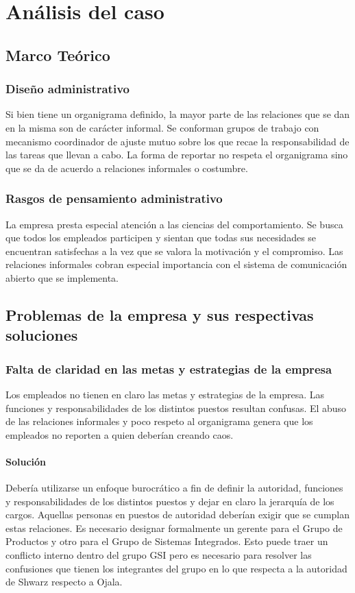\documentclass[12pt,a4paper,spanish]{article}
\begin{document}
\newpage
\section{An\'{a}lisis del caso}

	\subsection{Marco Te\'orico}

		\subsubsection{Dise\~{n}o administrativo}
			Si bien tiene un organigrama definido, la mayor parte de las relaciones que se dan en la misma son de car\'{a}cter informal. Se conforman grupos de trabajo con mecanismo coordinador de ajuste mutuo sobre los que recae la responsabilidad de las tareas que llevan a cabo. La forma de reportar no respeta el organigrama sino que se da de acuerdo a relaciones informales o costumbre.

		\subsubsection{Rasgos de pensamiento administrativo}
			La empresa presta especial atenci\'{o}n a las ciencias del comportamiento. Se busca que todos los empleados participen y sientan que todas sus necesidades se encuentran satisfechas a la vez que se valora la motivaci\'{o}n y el compromiso. Las relaciones informales cobran especial importancia con el sistema de comunicaci\'{o}n abierto que se implementa.

	\subsection{Problemas de la empresa y sus respectivas soluciones}


		\subsubsection{Falta de claridad en las metas y estrategias de la empresa}
			Los empleados no tienen en claro las metas y estrategias de la empresa. 
			Las funciones y responsabilidades de los distintos puestos resultan confusas.
			El abuso de las relaciones informales y poco respeto al organigrama genera que los empleados no reporten a quien deber\'{i}an creando caos. 
		\paragraph{Soluci\'on}
			Deber\'{i}a utilizarse un enfoque burocr\'{a}tico a fin de definir la autoridad, funciones y responsabilidades de los distintos puestos y dejar en claro la jerarqu\'{i}a de los cargos. 
			Aquellas personas en puestos de autoridad deber\'{i}an exigir que se cumplan estas relaciones. 
			Es necesario designar formalmente un gerente para el Grupo de Productos y otro para el Grupo de Sistemas Integrados. 
			Esto puede traer un conflicto interno dentro del grupo GSI  pero es necesario para resolver las confusiones que tienen los integrantes del grupo en lo que respecta a la autoridad de Shwarz respecto a Ojala.
		
\end{document}
